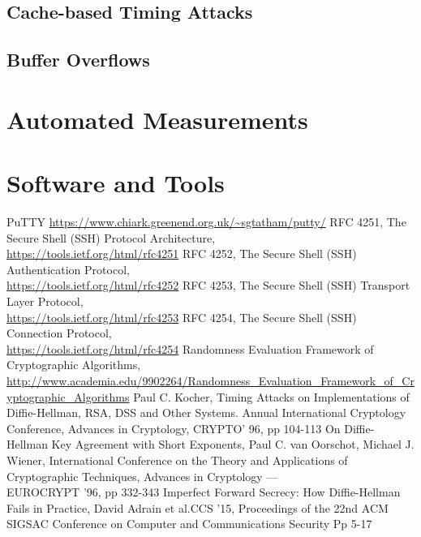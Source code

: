 \documentclass{report}
\begin{document}
\section{Cache-based Timing Attacks}
\section{Buffer Overflows}
\begin{appendices}
\chapter{Automated Measurements}
\chapter{Software and Tools}
\end{appendices}
\begin{thebibliography}{9}
PuTTY
\url{https://www.chiark.greenend.org.uk/~sgtatham/putty/}
RFC 4251, The Secure Shell (SSH) Protocol Architecture,\\
\url{https://tools.ietf.org/html/rfc4251}
RFC 4252, The Secure Shell (SSH) Authentication Protocol,\\  \url{https://tools.ietf.org/html/rfc4252}
RFC 4253, The Secure Shell (SSH) Transport Layer Protocol,\\ \url{https://tools.ietf.org/html/rfc4253}
RFC 4254, The Secure Shell (SSH) Connection Protocol,\\ \url{https://tools.ietf.org/html/rfc4254}
Randomness Evaluation Framework of Cryptographic Algorithms,\\
\url{http://www.academia.edu/9902264/Randomness_Evaluation_Framework_of_Cryptographic_Algorithms}
Paul C. Kocher, Timing Attacks on Implementations of Diffie-Hellman, RSA, DSS  and Other Systems. Annual International Cryptology Conference, Advances in Cryptology, CRYPTO' 96, pp 104-113
On Diffie-Hellman Key Agreement with Short Exponents, Paul C. van Oorschot, Michael J. Wiener, International Conference on the Theory and Applications of Cryptographic Techniques, Advances in Cryptology — \\EUROCRYPT '96, pp 332-343
Imperfect Forward Secrecy: How Diffie-Hellman Fails in Practice, David Adrain et al.CCS '15, Proceedings of the 22nd ACM SIGSAC Conference on Computer and Communications Security
Pp 5-17
\end{thebibliography}
\listoffigures
\end{document}
